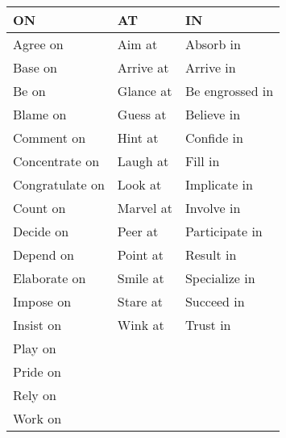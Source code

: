 \begin{table}
    \centering
    \begin{tabular}{lll}
        \toprule
        \textbf{ON} & \textbf{AT} & \textbf{IN} \\
        \midrule
        Agree on & Aim at & Absorb in \\
        Base on & Arrive at & Arrive in \\
        Be on & Glance at & Be engrossed in \\
        Blame on & Guess at & Believe in \\
        Comment on & Hint at & Confide in \\
        Concentrate on & Laugh at & Fill in \\
        Congratulate on & Look at & Implicate in \\
        Count on & Marvel at & Involve in \\
        Decide on & Peer at & Participate in \\
        Depend on & Point at & Result in \\
        Elaborate on & Smile at & Specialize in \\
        Impose on & Stare at & Succeed in \\
        Insist on & Wink at & Trust in \\
        Play on &  &  \\
        Pride on &  &  \\
        Rely on &  &  \\
        Work on &  &  \\
        \bottomrule
    \end{tabular}
    \caption{}
    \label{tab:}
\end{table}
